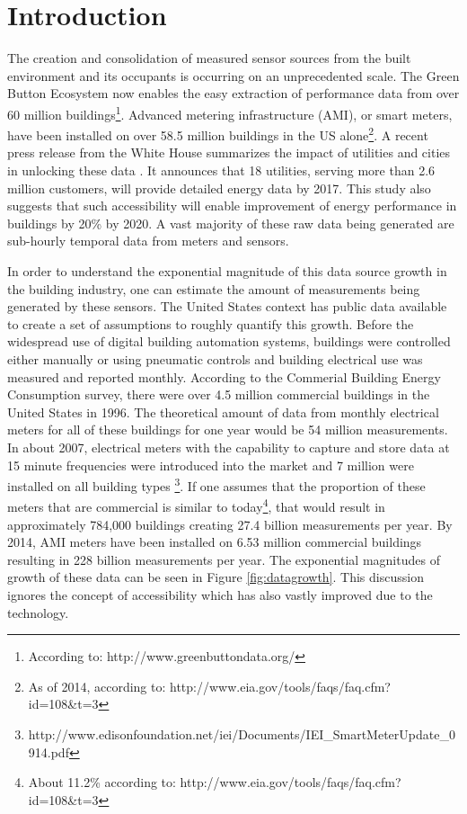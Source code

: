 \section{Introduction}
\label{sec:intro}

The creation and consolidation of measured sensor sources from the built environment and its occupants is occurring on an unprecedented scale. The Green Button Ecosystem now enables the easy extraction of performance data from over 60 million buildings\footnote{According to: http://www.greenbuttondata.org/}. Advanced metering infrastructure (AMI), or smart meters, have been installed on over 58.5 million buildings in the US alone\footnote{As of 2014, according to: http://www.eia.gov/tools/faqs/faq.cfm?id=108&t=3}. A recent press release from the White House summarizes the impact of utilities and cities in unlocking these data \cite{the_white_house_fact_2016}. It announces that 18 utilities, serving more than 2.6 million customers, will provide detailed energy data by 2017. This study also suggests that such accessibility will enable improvement of energy performance in buildings by 20\% by 2020. A vast majority of these raw data being generated are sub-hourly temporal data from meters and sensors.

In order to understand the exponential magnitude of this data source growth in the building industry, one can estimate the amount of measurements being generated by these sensors. The United States context has public data available to create a set of assumptions to roughly quantify this growth. Before the widespread use of digital building automation systems, buildings were controlled either manually or using pneumatic controls and building electrical use was measured and reported monthly. According to the Commerial Building Energy Consumption survey, there were over 4.5 million commercial buildings in the United States in 1996. The theoretical amount of data from monthly electrical meters for all of these buildings for one year would be 54 million measurements. In about 2007, electrical meters with the capability to capture and store data at 15 minute frequencies were introduced into the market and 7 million were installed on all building types \footnote{http://www.edisonfoundation.net/iei/Documents/IEI_SmartMeterUpdate_0914.pdf}. If one assumes that the proportion of these meters that are commercial is similar to today\footnote{About 11.2\% according to: http://www.eia.gov/tools/faqs/faq.cfm?id=108&t=3}, that would result in approximately 784,000 buildings creating 27.4 billion measurements per year. By 2014, AMI meters have been installed on 6.53 million commercial buildings resulting in 228 billion measurements per year. The exponential magnitudes of growth of these data can be seen in Figure \ref{fig:datagrowth}. This discussion ignores the concept of accessibility which has also vastly improved due to the technology.
